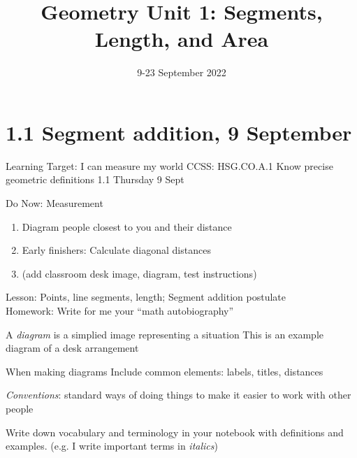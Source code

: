 

\title{Geometry Unit 1: Segments, Length, and Area}
\date{9-23 September 2022}


\frame{\titlepage}

\section[Outline]{}
\frame{\tableofcontents}

\section{1.1 Segment addition, 9 September}
\begin{frame}{Learning Target: I can measure my world}
  {CCSS: HSG.CO.A.1 Know precise geometric definitions \hfill \alert{1.1 Thursday 9 Sept}}
  \begin{block}{Do Now: Measurement}
    \begin{enumerate}
        \item Diagram people closest to you and their distance
        \item Early finishers: Calculate diagonal distances
        \item (add classroom desk image, diagram, test instructions)
    \end{enumerate}
    \end{block}
    Lesson: Points, line segments, length; Segment addition postulate \\[0.25cm]
    Homework: Write for me your ``math autobiography''
\end{frame}

\begin{frame}{A \emph{diagram} is a simplied image representing a situation}
  {This is an example diagram of a desk arrangement}
  \begin{block}{When making diagrams}
    Include common elements: labels, titles, distances \par
    \emph{Conventions}: standard ways of doing things to make it easier to work with other people
  \end{block} \vspace{1cm}
  Write down vocabulary and terminology in your notebook with definitions and examples. (e.g. I write important terms in \emph{italics})
\end{frame}

